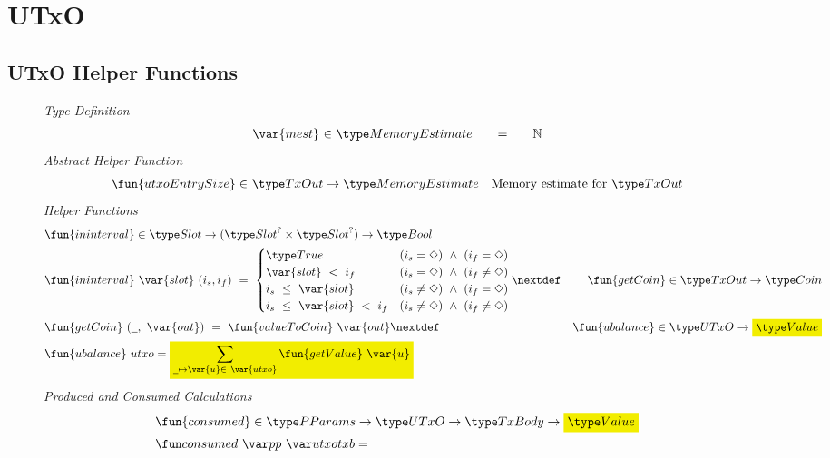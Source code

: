 \section{UTxO}
\label{sec:utxo}

\subsection*{UTxO Helper Functions}

\begin{figure}[htb]
  \emph{Type Definition}
  \begin{equation*}
    \begin{array}{r@{~\in~}l@{\qquad=\qquad}lr}
      \var{mest} & \MemoryEstimate & \N
    \end{array}
  \end{equation*}
  \emph{Abstract Helper Function}
  \begin{align*}
    \fun{utxoEntrySize} \in& ~\TxOut \to \MemoryEstimate & \text{Memory estimate for}~\TxOut
  \end{align*}
  \emph{Helper Functions}
  \begin{align*}
    & \fun{ininterval} \in \Slot \to (\Slot^? \times \Slot^?) \to \Bool \\
    & \fun{ininterval}~\var{slot}~(i_s, i_f) ~=~
    \begin{cases}
      \True & (i_s = \Nothing)~\wedge~(i_f = \Nothing) \\
      \var{slot}~<~i_f & (i_s = \Nothing)~\wedge~(i_f \neq \Nothing)\\
      i_s~\leq~\var{slot} & (i_s \neq \Nothing)~\wedge~(i_f = \Nothing) \\
      i_s~\leq~\var{slot}~<~i_f & (i_s \neq \Nothing)~\wedge~(i_f \neq \Nothing)
    \end{cases}
    \nextdef
    & \fun{getCoin} \in \TxOut \to \Coin \\
    & \fun{getCoin}~{(\wcard,~\var{out})} ~=~\fun{valueToCoin}~\var{out}
    \nextdef
    & \fun{ubalance} \in \UTxO \to \hldiff{\Value} \\
    & \fun{ubalance} ~ utxo = \hldiff{\sum_{\wcard\mapsto\var{u}\in~\var{utxo}} \fun{getValue}~\var{u}}
  \end{align*}
  \emph{Produced and Consumed Calculations}
  \begin{align*}
    & \fun{consumed} \in \PParams \to \UTxO \to \TxBody \to \hldiff{\Value} \\
    & \consumed{pp}{utxo}{txb} = \\

\end{align*}
\end{figure}
